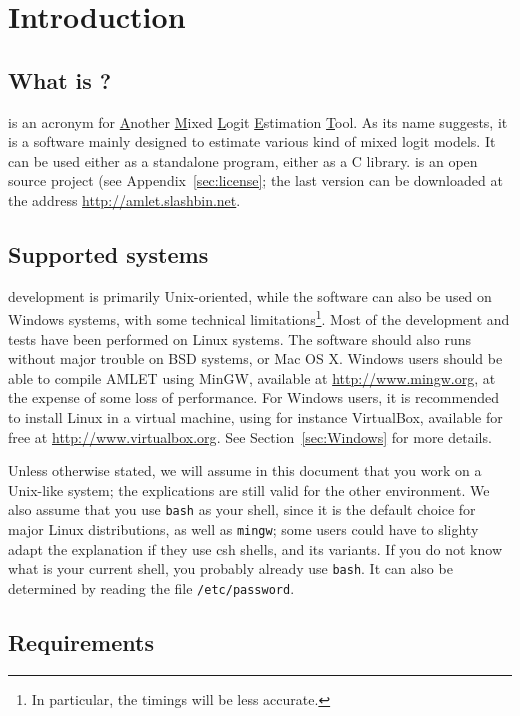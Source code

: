 \chapter{Introduction}

\section{What is \amlet?}

\amlet{} is an acronym for \underline{A}nother \underline{M}ixed
\underline{L}ogit \underline{E}stimation \underline{T}ool.
As its name suggests, it is a software mainly designed to estimate various
kind of mixed logit models.
It can be used either as a standalone program, either as a C library.
\amlet{} is an open source project (see Appendix~\ref{sec:license};
the last version can be downloaded at the address
\url{http://amlet.slashbin.net}.

\section{Supported systems}

\amlet{} development is primarily Unix-oriented, while the software
 can also be used on Windows systems, with some technical
 limitations\footnote{In particular, the timings will be less
 accurate.}.
Most of the development and tests have been performed on Linux systems.
The software should also runs without major trouble on BSD systems, or Mac OS X.
Windows users should be able to compile AMLET using MinGW, available at \url{http://www.mingw.org}, at the expense of some loss of performance.
For Windows users, it is recommended to install Linux in a virtual machine, using for instance VirtualBox, available for free at \url{http://www.virtualbox.org}. See Section~\ref{sec:Windows} for more details.

Unless otherwise stated, we will assume in this document that you
work on a Unix-like system; the explications are still valid for the
other environment. We also assume that you use \verb|bash| as your
shell, since it is the default choice for major Linux distributions,
as well as \verb|mingw|; some users could have to slighty adapt the
explanation if they use csh shells, and its variants.
If you do not know what is your current shell, you probably already
use \verb|bash|.
It can also be determined by reading the file \verb|/etc/password|.

\section{Requirements}

